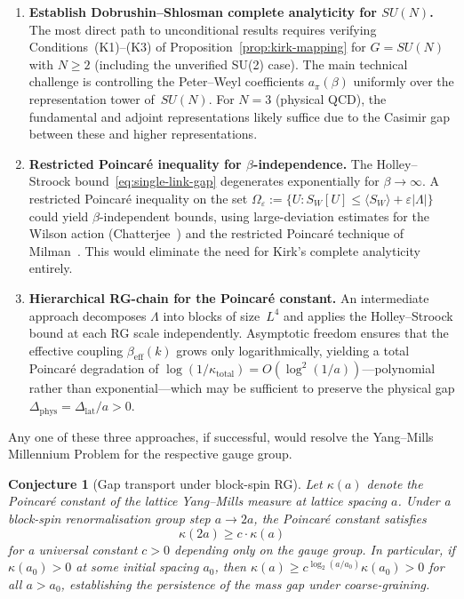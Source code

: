 \documentclass[12pt,a4paper]{article}
\theoremstyle{definition}
\theoremstyle{plain}
\newtheorem{conjecture}[definition]{Conjecture}
\theoremstyle{remark}
\begin{document}
\begin{enumerate}
    \item \textbf{Establish Dobrushin--Shlosman complete analyticity for $SU(N)$.}
    The most direct path to unconditional results requires verifying
    Conditions~(K1)--(K3) of Proposition~\ref{prop:kirk-mapping} for
    $G = SU(N)$ with $N \geq 2$ (including the unverified SU(2) case). The main technical challenge is
    controlling the Peter--Weyl coefficients $a_\pi(\beta)$ uniformly
    over the representation tower of~$SU(N)$. For $N = 3$ (physical
    QCD), the fundamental and adjoint representations likely suffice
    due to the Casimir gap between these and higher representations.

    \item \textbf{Restricted Poincar\'e inequality for $\beta$-independence.}
    The Holley--Stroock bound~\eqref{eq:single-link-gap} degenerates
    exponentially for $\beta \to \infty$. A restricted Poincar\'e
    inequality on the set $\Omega_\varepsilon := \{U : S_W[U] \leq
    \langle S_W\rangle + \varepsilon|\Lambda|\}$ could yield
    $\beta$-independent bounds, using large-deviation estimates for
    the Wilson action (Chatterjee~\cite{Chatterjee2016}) and the
    restricted Poincar\'e technique of
    Milman~\cite{Milman2009}. This would eliminate the need
    for Kirk's complete analyticity entirely.

    \item \textbf{Hierarchical RG-chain for the Poincar\'e constant.}
    An intermediate approach decomposes $\Lambda$ into blocks of
    size~$L^4$ and applies the Holley--Stroock bound at each RG scale
    independently. Asymptotic freedom ensures that the effective
    coupling $\beta_{\mathrm{eff}}(k)$ grows only logarithmically,
    yielding a total Poincar\'e degradation of
    $\log(1/\kappa_{\mathrm{total}}) = O(\log^2(1/a))$---polynomial
    rather than exponential---which may be sufficient to preserve the
    physical gap $\Delta_{\mathrm{phys}} = \Delta_{\mathrm{lat}}/a > 0$.
\end{enumerate}

Any one of these three approaches, if successful, would resolve the
Yang--Mills Millennium Problem for the respective gauge group.

\begin{conjecture}[Gap transport under block-spin RG]
\label{conj:gap-transport}
Let $\kappa(a)$ denote the Poincar\'e constant of the lattice Yang--Mills measure at lattice spacing $a$. Under a block-spin renormalisation group step $a \to 2a$, the Poincar\'e constant satisfies
\[
\kappa(2a) \geq c \cdot \kappa(a)
\]
for a universal constant $c > 0$ depending only on the gauge group. In particular, if $\kappa(a_0) > 0$ at some initial spacing $a_0$, then $\kappa(a) \geq c^{\log_2(a/a_0)} \kappa(a_0) > 0$ for all $a > a_0$, establishing the persistence of the mass gap under coarse-graining.
\end{conjecture}
\end{document}
